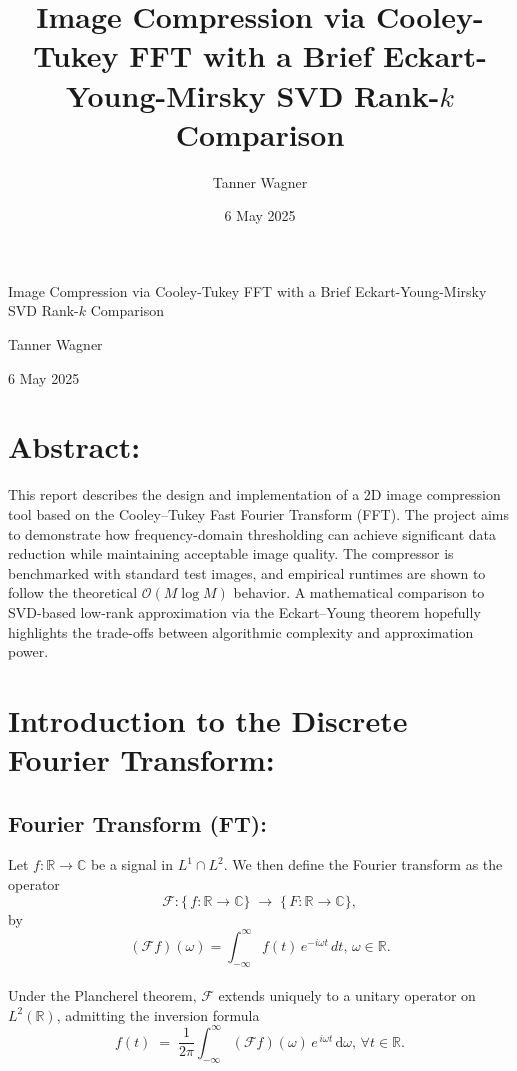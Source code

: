 \documentclass[12pt]{article}
\title{Image Compression via Cooley-Tukey FFT with a Brief Eckart-Young-Mirsky SVD Rank-$k$ Comparison}
\author{Tanner Wagner}
\date{6 May 2025}
\begin{document}
\begin{titlepage}
    \centering
    \vspace*{\fill}
    {\LARGE Image Compression via Cooley-Tukey FFT with a Brief Eckart-Young-Mirsky SVD Rank-$k$ Comparison\par}
    \vspace{1.5cm}
    {\Large Tanner Wagner\par}
    \vspace{1cm}
    {\large 6 May 2025\par}
    \vspace*{\fill}
\end{titlepage}

\newpage
\tableofcontents
\clearpage


\section{Abstract:}
\noindent This report describes the design and implementation of a 2D image compression tool based on the Cooley–Tukey Fast Fourier Transform (FFT). The project aims to demonstrate how frequency-domain thresholding can achieve significant data reduction while maintaining acceptable image quality. The compressor is benchmarked with standard test images, and empirical runtimes are shown to follow the theoretical $\mathcal{O}(M\log M)$ behavior. A mathematical comparison to SVD-based low-rank approximation via the Eckart–Young theorem hopefully highlights the trade-offs between algorithmic complexity and approximation power.


\section{Introduction to the Discrete Fourier Transform:}
\subsection{Fourier Transform (FT):}
Let \(f\colon \mathbb{R}\to\mathbb{C}\) be a signal in \(L^1\cap L^2\).  We then define the Fourier transform as the operator
\[
\mathcal{F}\colon \bigl\{\,f\colon \mathbb{R}\to\mathbb{C}\bigr\}\;\longrightarrow\;\bigl\{\,F\colon \mathbb{R}\to\mathbb{C}\bigr\},
\]
by
\[
(\mathcal{F}f)(\omega)
=\int_{-\infty}^{\infty}f(t)\,e^{-i\omega t}\,dt \text{, } \omega \in \mathbb{R}.
\]
\\
\noindent Under the Plancherel theorem, $\mathcal{F}$ extends uniquely to a unitary operator on $L^2(\mathbb{R})$, admitting the inversion formula
\[
f(t)
\;=\;
\frac{1}{2\pi}
\int_{-\infty}^{\infty}
(\mathcal{F}f)(\omega)\,e^{\,i\omega t}\,\mathrm{d}\omega \text{, } \forall t\in\mathbb{R}.
\]
\end{document}
